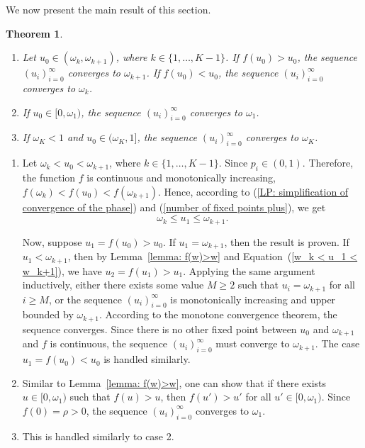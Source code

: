 \documentclass{IEEEtran}
\newtheorem{theorem}{Theorem}
\begin{document}
We now present the main result of this section.
\begin{theorem} \label{thm: convergence of the fixed point}
\leavevmode
\begin{enumerate}
\item Let $u_0 \in (\omega_k, \omega_{k+1})$, where $k \in \{1,\ldots,K-1\}$.
If $f(u_{0}) > u_{0}$, the sequence $(u_i)_{i=0}^{\infty}$ converges to $\omega_{k+1}$.
If $f(u_{0}) < u_{0}$, the sequence $(u_i)_{i=0}^{\infty}$ converges to $\omega_{k}$.
\item If $u_0 \in [0, \omega_1)$,  the sequence $(u_i)_{i=0}^{\infty}$ converges to $\omega_1$.
\item If $\omega_K<1$ and $u_0 \in (\omega_K, 1]$,  the sequence $(u_i)_{i=0}^{\infty}$ converges to $\omega_K$.

\end{enumerate}
\end{theorem}
\begin{IEEEproof}
\leavevmode
\begin{enumerate}
\item Let $\omega_k < u_0 < \omega_{k+1}$, where $k \in \{1,\ldots,K-1\}$. Since
$p_i \in (0, 1)$. Therefore,
the function $f$ is continuous and monotonically increasing,
$f(\omega_k) < f(u_0) < f(\omega_{k+1})$. Hence, according to (\ref{LP: simplification of convergence of the phase}) and (\ref{number of fixed
points plus}), we get
\begin{equation} \label{w_k < u_1 < w_k+1}
\omega_k \leq u_1 \leq \omega_{k+1}.
\end{equation}



Now, suppose \mbox{$u_1= f(u_{0}) > u_{0}$}.
If $u_1 = \omega_{k+1}$, then the result is proven.
If $u_1 < \omega_{k+1}$, then by Lemma~\ref{lemma: f(w)>w} and  Equation~(\ref{w_k < u_1 < w_k+1}), we have $u_2 = f(u_1) > u_1$. Applying the
same argument inductively, either there exists some value $M \geq 2$ such that $u_i=\omega_{k+1}$ for all $ i \geq M$, or the sequence
$(u_i)_{i=0}^{\infty}$ is monotonically increasing and upper bounded by $\omega_{k+1}$. According to the monotone convergence theorem, the
sequence converges. Since there is no other fixed point between $u_0$ and $\omega_{k+1}$ and $f$ is continuous, the sequence
$(u_i)_{i=0}^{\infty}$ must converge to $\omega_{k+1}$. The case $u_1 = f(u_{0}) < u_{0}$ is handled similarly.

\item Similar to Lemma~\ref{lemma: f(w)>w}, one can show that if there exists $u \in [0, \omega_1)$ such that  $f(u) >u$, then $f(u')>u'$ for all
    $u' \in [0, \omega_1)$.  Since $f(0)=\rho>0$, the sequence $(u_i)_{i=0}^{\infty}$ converges to $\omega_1$.

\item This is handled similarly to case 2.
\end{enumerate}
\end{IEEEproof}
\end{document}

